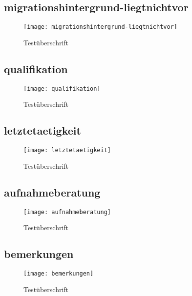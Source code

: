 \begin{landscape}
\subsection{migrationshintergrund-liegtnichtvor}
\begin{figure}[H]
    \centering
    \caption{Testüberschrift}
    \begin{adjustbox}{width=\linewidth, center}
        \texttt{[image: migrationshintergrund-liegtnichtvor]}
    \end{adjustbox}
\end{figure}

\subsection{qualifikation}
\begin{figure}[H]
    \centering
    \caption{Testüberschrift}
    \begin{adjustbox}{width=\linewidth, center}
        \texttt{[image: qualifikation]}
    \end{adjustbox}
\end{figure}

\subsection{letztetaetigkeit}
\begin{figure}[H]
    \centering
    \caption{Testüberschrift}
    \begin{adjustbox}{width=\linewidth, center}
        \texttt{[image: letztetaetigkeit]}
    \end{adjustbox}
\end{figure}

\subsection{aufnahmeberatung}
\begin{figure}[H]
    \centering
    \caption{Testüberschrift}
    \begin{adjustbox}{width=\linewidth, center}
        \texttt{[image: aufnahmeberatung]}
    \end{adjustbox}
\end{figure}

\subsection{bemerkungen}
\begin{figure}[H]
    \centering
    \caption{Testüberschrift}
    \begin{adjustbox}{width=\linewidth, center}
        \texttt{[image: bemerkungen]}
    \end{adjustbox}
\end{figure}


\end{landscape}

